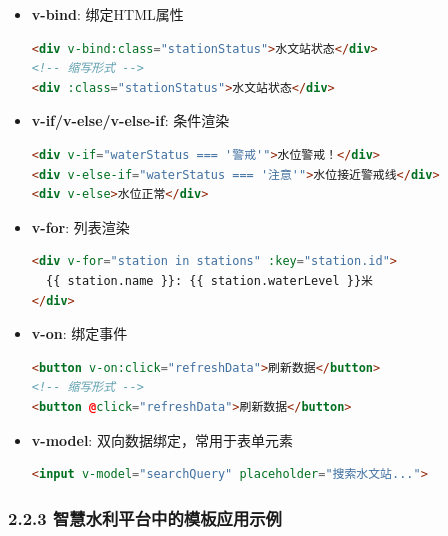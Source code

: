 \begin{itemize}
\item
  \textbf{v-bind}: 绑定HTML属性

\begin{lstlisting}[language=HTML]
<div v-bind:class="stationStatus">水文站状态</div>
<!-- 缩写形式 -->
<div :class="stationStatus">水文站状态</div>
\end{lstlisting}
\item
  \textbf{v-if/v-else/v-else-if}: 条件渲染

\begin{lstlisting}[language=HTML]
<div v-if="waterStatus === '警戒'">水位警戒！</div>
<div v-else-if="waterStatus === '注意'">水位接近警戒线</div>
<div v-else>水位正常</div>
\end{lstlisting}
\item
  \textbf{v-for}: 列表渲染

\begin{lstlisting}[language=HTML]
<div v-for="station in stations" :key="station.id">
  {{ station.name }}: {{ station.waterLevel }}米
</div>
\end{lstlisting}
\item
  \textbf{v-on}: 绑定事件

\begin{lstlisting}[language=HTML]
<button v-on:click="refreshData">刷新数据</button>
<!-- 缩写形式 -->
<button @click="refreshData">刷新数据</button>
\end{lstlisting}
\item
  \textbf{v-model}: 双向数据绑定，常用于表单元素

\begin{lstlisting}[language=HTML]
<input v-model="searchQuery" placeholder="搜索水文站...">
\end{lstlisting}
\end{itemize}

\subsubsection{2.2.3
智慧水利平台中的模板应用示例}\label{ux667aux6167ux6c34ux5229ux5e73ux53f0ux4e2dux7684ux6a21ux677fux5e94ux7528ux793aux4f8b}

